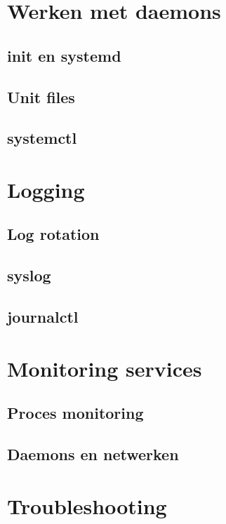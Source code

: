 \documentclass[a4paper,12pt,twoside,openright,titlepage]{book}
\begin{document}
\chapter{Werken met daemons}

\section{init en systemd}

\section{Unit files}

\section{systemctl}


\chapter{Logging}

\section{Log rotation}\label{sec:logrotate}

\section{syslog}\label{sec:syslog}


\section{journalctl}\label{sec:journalctl}


\chapter{Monitoring services}

\section{Proces monitoring}

\section{Daemons en netwerken}


\chapter{Troubleshooting}


\printindex
\end{document}
